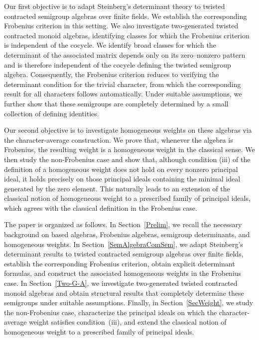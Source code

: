 \documentclass[11pt,reqno]{amsart}
\theoremstyle{plain}
\theoremstyle{remark}
\theoremstyle{definition}
\begin{document}
Our first objective is to adapt Steinberg's determinant theory to twisted contracted semigroup algebras over finite fields. We establish the corresponding Frobenius criterion in this setting. 
We also investigate two-generated twisted contracted monoid algebras, identifying classes for which the Frobenius criterion is independent of the cocycle. We identify broad classes for which the determinant of the associated matrix depends only on its zero--nonzero pattern and is therefore independent of the cocycle defining the twisted semigroup algebra. Consequently, the Frobenius criterion reduces to verifying the determinant condition for the trivial character, from which the corresponding result for all characters follows automatically. Under suitable assumptions, we further show that these semigroups are completely determined by a small collection of defining identities.

Our second objective is to investigate homogeneous weights on these algebras via the character-average construction. We prove that, whenever the algebra is Frobenius, the resulting weight is a homogeneous weight in the classical sense. We then study the non-Frobenius case and show that, although condition {\rm(iii)} of the definition of a homogeneous weight does not hold on every nonzero principal ideal, it holds precisely on those principal ideals containing the minimal ideal generated by the zero element. This naturally leads to an extension of the classical notion of homogeneous weight to a prescribed family of principal ideals, which agrees with the classical definition in the Frobenius case.

The paper is organized as follows. In Section~\ref{Prelim}, we recall the
necessary background on based algebras, Frobenius algebras, semigroup
determinants, and homogeneous weights. In
Section~\ref{SemAlgebraComSem}, we adapt Steinberg's determinant results to
twisted contracted semigroup algebras over finite fields, establish the
corresponding Frobenius criterion, obtain explicit determinant formulas, and
construct the associated homogeneous weights in the Frobenius case. In
Section~\ref{Two-G-A}, we investigate two-generated twisted contracted monoid
algebras and obtain structural results that completely determine these
semigroups under suitable assumptions. Finally, in
Section~\ref{SecWeight}, we study the non-Frobenius case, characterize the
principal ideals on which the character-average weight satisfies
condition~{\rm(iii)}, and extend the classical notion of homogeneous weight to
a prescribed family of principal ideals.
\end{document}
